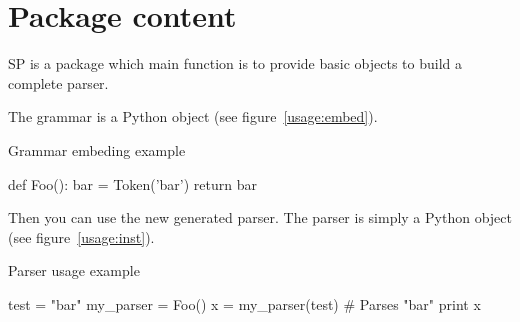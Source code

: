 \section{Package content}

SP is a package which main function is to provide basic objects to build a complete parser.

The grammar is a Python object (see figure~\ref{usage:embed}).

\begin{code}
\caption{Grammar embeding example}                          \label{usage:embed}
\begin{verbatimtab}[4]
    def Foo():
        bar = Token('bar')
        return bar
\end{verbatimtab}
\end{code}

Then you can use the new generated parser. The parser is simply a Python object (see figure~\ref{usage:inst}).

\begin{code}
\caption{Parser usage example}                              \label{usage:inst}
\begin{verbatimtab}[4]
    test = "bar"
    my_parser = Foo()
    x = my_parser(test)               # Parses "bar"
    print x
\end{verbatimtab}
\end{code}
